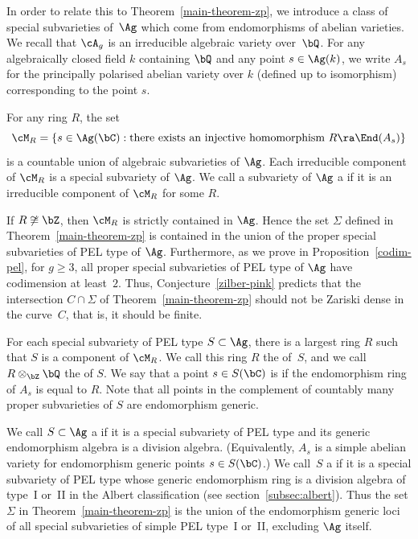 In order to relate this to Theorem~\ref{main-theorem-zp}, we introduce a class of special subvarieties of~$\Ag$ which come from endomorphisms of abelian varieties.
We recall that $\cA_g$ is an irreducible algebraic variety over~$\bQ$.
For any algebraically closed field $k$ containing $\bQ$ and any point $s \in \Ag(k)$, we write $A_s$ for the principally polarised abelian variety over $k$ (defined up to isomorphism) corresponding to the point $s$.

For any ring $R$, the set
\[
\cM_R = \{ s \in \Ag(\bC) : \text{there exists an injective homomorphism } R \ra \End(A_s) \}
\]
is a countable union of algebraic subvarieties of $\Ag$.
Each irreducible component of $\cM_R$ is a special subvariety of $\Ag$.
We call a subvariety of $\Ag$ a  if it is an irreducible component of $\cM_R$ for some $R$.

If $R \not\cong \bZ$, then $\cM_R$ is strictly contained in $\Ag$.
Hence the set $\Sigma$ defined in Theorem~\ref{main-theorem-zp} is contained in the union of the proper special subvarieties of PEL type of $\Ag$.
Furthermore, as we prove in Proposition~\ref{codim-pel}, for $g \geq 3$, all proper special subvarieties of PEL type of $\Ag$ have codimension at least~$2$.
Thus, Conjecture~\ref{zilber-pink} predicts that the intersection $C \cap \Sigma$ of Theorem~\ref{main-theorem-zp} should not be Zariski dense in the curve~$C$, that is, it should be finite.

For each special subvariety of PEL type $S \subset \Ag$, there is a largest ring $R$ such that $S$ is a component of $\cM_R$.
We call this ring $R$ the  of~$S$, and we call $R \otimes_\bZ \bQ$ the  of $S$.
We say that a point $s\in S(\bC)$ is  if the endomorphism ring of $A_s$ is equal to $R$. Note that all points in the complement of countably many proper subvarieties of $S$ are endomorphism generic.

We call $S \subset \Ag$ a  if it is a special subvariety of PEL type and its generic endomorphism algebra is a division algebra.
(Equivalently, $A_s$ is a simple abelian variety for endomorphism generic points $s \in S(\bC)$.)
We call~$S$ a  if it is a special subvariety of PEL type whose generic endomorphism ring is a division algebra of type~I or~II in the Albert classification (see section~\ref{subsec:albert}).
Thus the set $\Sigma$ in Theorem~\ref{main-theorem-zp} is the union of the endomorphism generic loci of all special subvarieties of simple PEL type~I or~II, excluding $\Ag$ itself.

